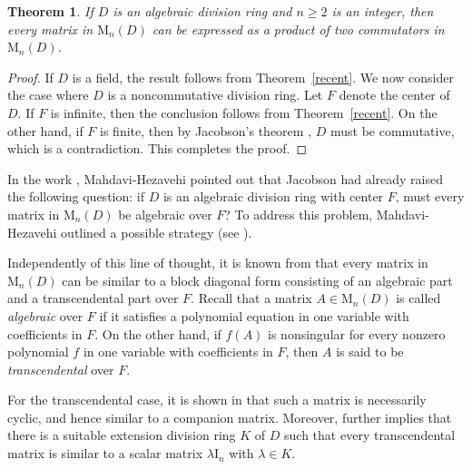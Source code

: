 \documentclass[11pt]{article}
\newtheorem{theorem}{Theorem}
\theoremstyle{definition}
\begin{document}
{{{{				
				
				\begin{theorem} \label{algebraic}
					If $D$ is an algebraic division ring and $n\geq 2$ is an integer, then every matrix in $\mathrm{M}_n(D)$ can be expressed as a product of two commutators in $\mathrm{M}_n(D)$.
				\end{theorem}
				
				\begin{proof}
					If $D$ is a field, the result follows from Theorem~\ref{recent}. We now consider the case where $D$ is a noncommutative division ring. Let $F$ denote the center of $D$. If $F$ is infinite, then the conclusion follows from Theorem~\ref{recent}. On the other hand, if $F$ is finite, then by Jacobson's theorem \cite[(13.11) Theorem]{Bo_Lam_91}, $D$ must be commutative, which is a contradiction. This completes the proof.
				\end{proof}
				
				In the work \cite{Pa_Mad_00}, Mahdavi-Hezavehi pointed out that Jacobson \cite{Bo_Ja_56} had already raised the following question: if $D$ is an algebraic division ring with center $F$, must every matrix in $\mathrm{M}_n(D)$ be algebraic over $F$? To address this problem, Mahdavi-Hezavehi outlined a possible strategy (see \cite[Corollaries~5.16 and~5.18]{Pa_Mad_00}).
				
				Independently of this line of thought, it is known from \cite[Theorem~3.2]{Pa_Co_73} that every matrix in $\mathrm{M}_n(D)$ can be similar to a block diagonal form consisting of an algebraic part and a transcendental part over $F$. Recall that a matrix $A \in \mathrm{M}_n(D)$ is called \emph{algebraic} over $F$ if it satisfies a polynomial equation in one variable with coefficients in $F$. On the other hand, if $f(A)$ is nonsingular for every nonzero polynomial $f$ in one variable with coefficients in $F$, then $A$ is said to be \emph{transcendental} over $F$.
				
				For the transcendental case, it is shown in \cite[Corollary, Section~3]{Pa_Co_73} that such a matrix is necessarily cyclic, and hence similar to a companion matrix. Moreover, \cite[Corollary~1, Section~4]{Pa_Co_73} further implies that there is a suitable extension division ring $K$ of $D$ such that every transcendental matrix is similar to a scalar matrix $\lambda \mathrm{I}_n$ with $\lambda \in K$.
				
}}}}
\end{document}
